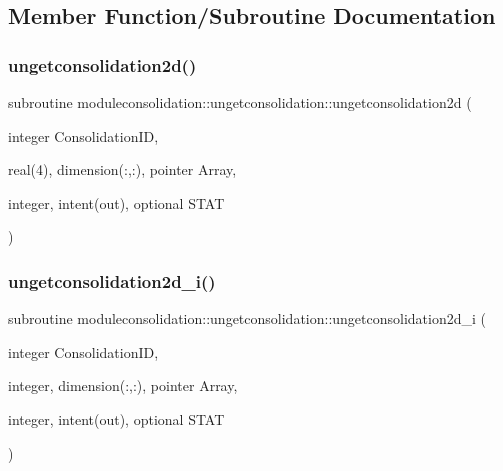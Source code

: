 \subsection{Member Function/\+Subroutine Documentation}
\mbox{\label{interfacemoduleconsolidation_1_1ungetconsolidation_a33d9def64f09eab2c66338cff353fc12}} 
\subsubsection{\texorpdfstring{ungetconsolidation2d()}{ungetconsolidation2d()}}
{\footnotesize\ttfamily subroutine moduleconsolidation\+::ungetconsolidation\+::ungetconsolidation2d (\begin{DoxyParamCaption}\item[{integer}]{Consolidation\+ID,  }\item[{real(4), dimension(\+:,\+:), pointer}]{Array,  }\item[{integer, intent(out), optional}]{S\+T\+AT }\end{DoxyParamCaption})\hspace{0.3cm}{\ttfamily [private]}}

\mbox{\label{interfacemoduleconsolidation_1_1ungetconsolidation_a4edefb4fe481185661560f21ae240dd0}} 
\subsubsection{\texorpdfstring{ungetconsolidation2d\+\_\+i()}{ungetconsolidation2d\_i()}}
{\footnotesize\ttfamily subroutine moduleconsolidation\+::ungetconsolidation\+::ungetconsolidation2d\+\_\+i (\begin{DoxyParamCaption}\item[{integer}]{Consolidation\+ID,  }\item[{integer, dimension(\+:,\+:), pointer}]{Array,  }\item[{integer, intent(out), optional}]{S\+T\+AT }\end{DoxyParamCaption})\hspace{0.3cm}{\ttfamily [private]}}

